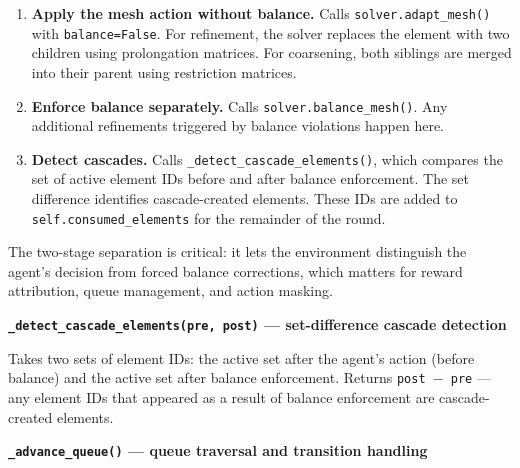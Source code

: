 \documentclass[11pt]{article}
\newcommand{\method}[1]{\textcolor{codeblue}{\texttt{#1}}}
\begin{document}
\begin{enumerate}[leftmargin=1.5em, itemsep=3pt]
    \item \textbf{Apply the mesh action without balance.} Calls \method{solver.adapt\_mesh()} with \texttt{balance=False}. For refinement, the solver replaces the element with two children using prolongation matrices. For coarsening, both siblings are merged into their parent using restriction matrices.
    \item \textbf{Enforce balance separately.} Calls \method{solver.balance\_mesh()}. Any additional refinements triggered by balance violations happen here.
    \item \textbf{Detect cascades.} Calls \method{\_detect\_cascade\_elements()}, which compares the set of active element IDs before and after balance enforcement. The set difference identifies cascade-created elements. These IDs are added to \method{self.consumed\_elements} for the remainder of the round.
\end{enumerate}

\noindent The two-stage separation is critical: it lets the environment distinguish the agent's decision from forced balance corrections, which matters for reward attribution, queue management, and action masking.

\vspace{0.3cm}

\noindent\textbf{\method{\_detect\_cascade\_elements(pre, post)} \textnormal{--- set-difference cascade detection}}

\vspace{0.1cm}
\noindent Takes two sets of element IDs: the active set after the agent's action (before balance) and the active set after balance enforcement. Returns \texttt{post $-$ pre} --- any element IDs that appeared as a result of balance enforcement are cascade-created elements.

\vspace{0.3cm}

\noindent\textbf{\method{\_advance\_queue()} \textnormal{--- queue traversal and transition handling}}
\end{document}
